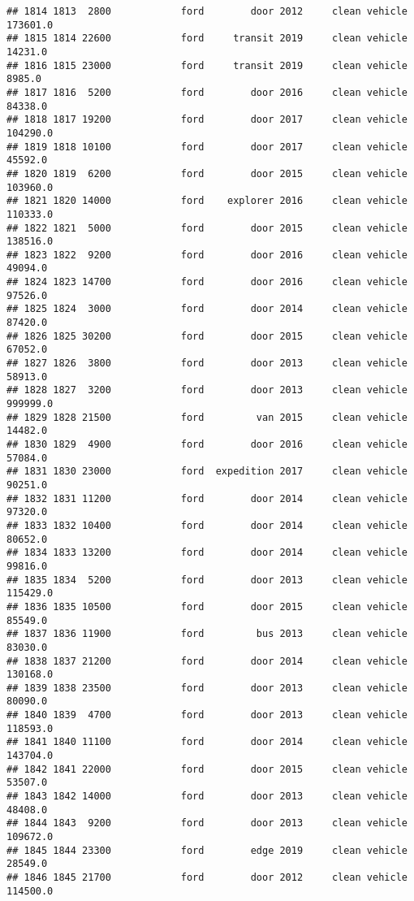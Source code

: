 \documentclass[
]{article}
\begin{document}
\begin{verbatim}
## 1814 1813  2800            ford        door 2012     clean vehicle  173601.0
## 1815 1814 22600            ford     transit 2019     clean vehicle   14231.0
## 1816 1815 23000            ford     transit 2019     clean vehicle    8985.0
## 1817 1816  5200            ford        door 2016     clean vehicle   84338.0
## 1818 1817 19200            ford        door 2017     clean vehicle  104290.0
## 1819 1818 10100            ford        door 2017     clean vehicle   45592.0
## 1820 1819  6200            ford        door 2015     clean vehicle  103960.0
## 1821 1820 14000            ford    explorer 2016     clean vehicle  110333.0
## 1822 1821  5000            ford        door 2015     clean vehicle  138516.0
## 1823 1822  9200            ford        door 2016     clean vehicle   49094.0
## 1824 1823 14700            ford        door 2016     clean vehicle   97526.0
## 1825 1824  3000            ford        door 2014     clean vehicle   87420.0
## 1826 1825 30200            ford        door 2015     clean vehicle   67052.0
## 1827 1826  3800            ford        door 2013     clean vehicle   58913.0
## 1828 1827  3200            ford        door 2013     clean vehicle  999999.0
## 1829 1828 21500            ford         van 2015     clean vehicle   14482.0
## 1830 1829  4900            ford        door 2016     clean vehicle   57084.0
## 1831 1830 23000            ford  expedition 2017     clean vehicle   90251.0
## 1832 1831 11200            ford        door 2014     clean vehicle   97320.0
## 1833 1832 10400            ford        door 2014     clean vehicle   80652.0
## 1834 1833 13200            ford        door 2014     clean vehicle   99816.0
## 1835 1834  5200            ford        door 2013     clean vehicle  115429.0
## 1836 1835 10500            ford        door 2015     clean vehicle   85549.0
## 1837 1836 11900            ford         bus 2013     clean vehicle   83030.0
## 1838 1837 21200            ford        door 2014     clean vehicle  130168.0
## 1839 1838 23500            ford        door 2013     clean vehicle   80090.0
## 1840 1839  4700            ford        door 2013     clean vehicle  118593.0
## 1841 1840 11100            ford        door 2014     clean vehicle  143704.0
## 1842 1841 22000            ford        door 2015     clean vehicle   53507.0
## 1843 1842 14000            ford        door 2013     clean vehicle   48408.0
## 1844 1843  9200            ford        door 2013     clean vehicle  109672.0
## 1845 1844 23300            ford        edge 2019     clean vehicle   28549.0
## 1846 1845 21700            ford        door 2012     clean vehicle  114500.0

\end{verbatim}
\end{document}
